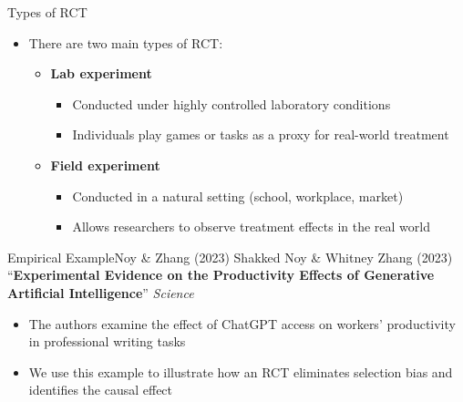 \documentclass[hyperref={pdfpagelabels=false}]{beamer}
\begin{document}
	\begin{frame}{Types of RCT}
		\begin{itemize}
			\item There are two main types of RCT:
			\vspace{0.2cm}
			\begin{itemize}
				\item[1] \textbf{Lab experiment}
				\vspace{0.2cm}
				\begin{itemize}
					\item Conducted under highly controlled laboratory conditions
					\vspace{0.1cm}
					\item Individuals play games or tasks as a proxy for real-world treatment
				\end{itemize}
				\vspace{0.3cm}
				\item[2] \textbf{Field experiment}
				\vspace{0.2cm}
				\begin{itemize}
					\item Conducted in a natural setting (school, workplace, market)
					\vspace{0.1cm}
					\item Allows researchers to observe treatment effects in the real world
				\end{itemize}
			\end{itemize}
		\end{itemize}
	\end{frame}
	

	
\begin{frame}{Empirical Example}{Noy \& Zhang (2023)}
	Shakked Noy \& Whitney Zhang (2023) ``\textbf{Experimental Evidence on the Productivity Effects of Generative Artificial Intelligence}'' \textit{Science}
	\begin{itemize}
		\vspace{0.2cm}
		\item The authors examine the effect of ChatGPT access on workers' productivity in professional writing tasks
		\vspace{0.2cm}
		\item We use this example to illustrate how an RCT eliminates selection bias and identifies the causal effect
	\end{itemize}
\end{frame}
\end{document}
